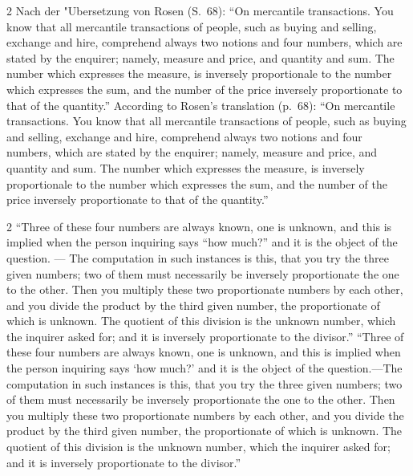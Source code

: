 \documentclass[10pt,a4paper]{article}
\renewcommand{\switchcolumn}{\syncronize\nointerlineskip\columnbreak}
\newcommand{\enquote}[1]{``#1''}
\begin{document}
\begin{paracol}{2}
Nach der "Ubersetzung von Rosen (S.\ 68): \enquote{On mercantile transactions. You know that all mercantile transactions of people, such as buying and selling, exchange and hire, comprehend always two notions and four numbers, which are stated by the enquirer; namely, measure and price, and quantity and sum. The number which expresses the measure, is inversely proportionale to the number which expresses the sum, and the number of the price inversely proportionate to that of the quantity.}
\switchcolumn
According to Rosen's translation (p.\ 68): ``On mercantile transactions. You know that all mercantile transactions of people, such as buying and selling, exchange and hire, comprehend always two notions and four numbers, which are stated by the enquirer; namely, measure and price, and quantity and sum. The number which expresses the measure, is inversely proportionale to the number which expresses the sum, and the number of the price inversely proportionate to that of the quantity.''
\end{paracol}

\begin{paracol}{2}
\enquote{Three of these four numbers are always known, one is unknown, and this is implied when the person inquiring says \enquote{how much?} and it is the object of the question. --- The computation in such instances is this, that you try the three given numbers; two of them must necessarily be inversely proportionate the one to the other. Then you multiply these two proportionate numbers by each other, and you divide the product by the third given number, the proportionate of which is unknown. The quotient of this division is the unknown number, which the inquirer asked for; and it is inversely proportionate to the divisor.}
\switchcolumn
``Three of these four numbers are always known, one is unknown, and this is implied when the person inquiring says `how much?' and it is the object of the question.---The computation in such instances is this, that you try the three given numbers; two of them must necessarily be inversely proportionate the one to the other. Then you multiply these two proportionate numbers by each other, and you divide the product by the third given number, the proportionate of which is unknown. The quotient of this division is the unknown number, which the inquirer asked for; and it is inversely proportionate to the divisor.''
\end{paracol}
\end{document}
